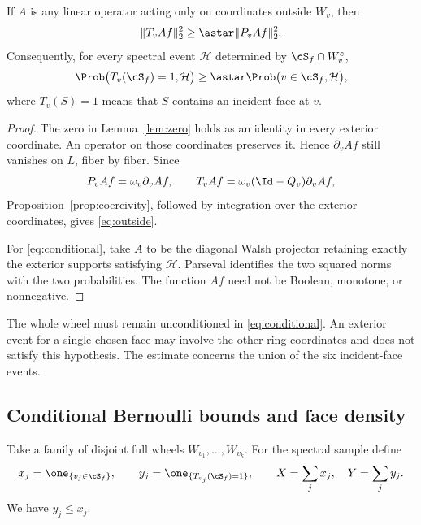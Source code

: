\begin{proposition}\label{prop:outside}
If $A$ is any linear operator acting only on coordinates outside $W_v$, then
\begin{equation}\label{eq:outside}
 \|T_vAf\|_2^2\ge\astar\|P_vAf\|_2^2.
\end{equation}
Consequently, for every spectral event $\mathcal H$ determined by $\cS_f\cap W_v^c$,
\begin{equation}\label{eq:conditional}
 \Prob\bigl(T_v(\cS_f)=1,\mathcal H\bigr)
 \ge\astar\Prob\bigl(v\in\cS_f,\mathcal H\bigr),
\end{equation}
where $T_v(S)=1$ means that $S$ contains an incident face at $v$.
\end{proposition}
\begin{proof}
The zero in Lemma~\ref{lem:zero} holds as an identity in every exterior coordinate. An operator on those coordinates preserves it. Hence $\partial_vAf$ still vanishes on $L$, fiber by fiber. Since
\[
 P_vAf=\omega_v\partial_vAf,
 \qquad T_vAf=\omega_v(\Id-Q_v)\partial_vAf,
\]
Proposition~\ref{prop:coercivity}, followed by integration over the exterior coordinates, gives \eqref{eq:outside}.

For \eqref{eq:conditional}, take $A$ to be the diagonal Walsh projector retaining exactly the exterior supports satisfying $\mathcal H$. Parseval identifies the two squared norms with the two probabilities. The function $Af$ need not be Boolean, monotone, or nonnegative.
\end{proof}

The whole wheel must remain unconditioned in \eqref{eq:conditional}. An exterior event for a single chosen face may involve the other ring coordinates and does not satisfy this hypothesis. The estimate concerns the union of the six incident-face events.

\subsection{Conditional Bernoulli bounds and face density}\label{sec:amplification}

Take a family of disjoint full wheels $W_{v_1},\ldots,W_{v_k}$. For the spectral sample define
\[
 x_j=\one_{\{v_j\in\cS_f\}},\qquad
 y_j=\one_{\{T_{v_j}(\cS_f)=1\}},
 \qquad X=\sum_jx_j,\quad Y=\sum_jy_j.
\]
We have $y_j\le x_j$.

